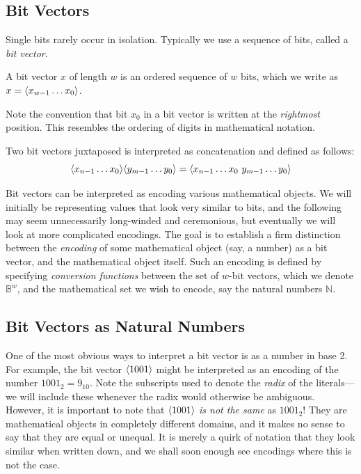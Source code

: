 \subsection{Bit Vectors}

Single bits rarely occur in isolation.  Typically we use a sequence of
bits, called a \emph{bit vector}.

\begin{definition}
  A bit vector $x$ of length $w$ is an ordered sequence of $w$ bits,
  which we write as $x=\langle x_{w-1}\ldots{}x_{0} \rangle$.
\end{definition}

Note the convention that bit $x_{0}$ in a bit vector is written at the
\emph{rightmost} position. This resembles the ordering of digits in
mathematical notation.

\begin{definition}
  Two bit vectors juxtaposed is interpreted as concatenation and
  defined as follows:
  \[
    \langle x_{n-1}\ldots{}x_{0} \rangle \langle y_{m-1}\ldots{}y_{0} \rangle
    = \langle x_{n-1}\ldots{}x_{0}~y_{m-1}\ldots{}y_{0} \rangle
  \]
\end{definition}


Bit vectors can be interpreted as encoding various mathematical
objects.  We will initially be representing values that look very
similar to bits, and the following may seem unnecessarily long-winded
and ceremonious, but eventually we will look at more complicated
encodings.  The goal is to establish a firm distinction between the
\emph{encoding} of some mathematical object (say, a number) as a bit
vector, and the mathematical object itself.  Such an encoding is
defined by specifying \emph{conversion functions} between the set of
$w$-bit vectors, which we denote $\mathbb{B}^{w}$, and the
mathematical set we wish to encode, say the natural numbers
$\mathbb{N}$.

\subsection{Bit Vectors as Natural Numbers}
\label{sec:bitnats}

One of the most obvious ways to interpret a bit vector is as a number
in base 2. For example, the bit vector $\langle 1001 \rangle$ might be
interpreted as an encoding of the number $1001_{2} = 9_{10}$. Note the
subscripts used to denote the \emph{radix} of the literals---we will
include these whenever the radix would otherwise be ambiguous.
However, it is important to note that $\langle 1001 \rangle$ \emph{is not
  the same} as $1001_{2}$! They are mathematical objects in completely
different domains, and it makes no sense to say that they are equal or
unequal. It is merely a quirk of notation that they look similar when
written down, and we shall soon enough see encodings where this is not
the case.

